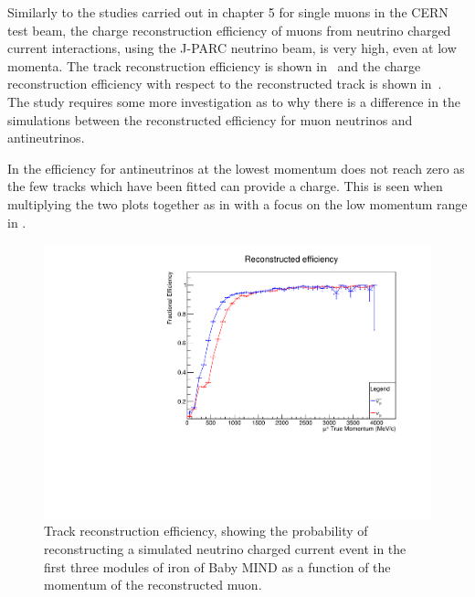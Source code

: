 Similarly to the studies carried out in chapter 5 for single muons in the CERN test beam, the charge reconstruction efficiency of muons from neutrino charged current interactions, using the J-PARC neutrino beam, is very high, even at low momenta. The track reconstruction efficiency is shown in~ and the charge reconstruction efficiency with respect to the reconstructed track is shown in~. The study requires some more investigation as to why there is a difference in the simulations between the reconstructed efficiency for muon neutrinos and antineutrinos.


In  the efficiency for antineutrinos at the lowest momentum does not reach zero as the few tracks which have been fitted can provide a charge. This is seen when multiplying the two plots together as in  with a focus on the low momentum range in .




\begin{figure}[h!]
\centering
\includegraphics[width=.9\textwidth]{figures/NeutrinoChap/Neutrino/T2KIronRecEff.pdf}
\caption{Track reconstruction efficiency, showing the probability of reconstructing a simulated neutrino charged current event in the first three modules of iron of Baby MIND as a function of the momentum of the reconstructed muon.}
\label{fig:IronMINDfitted}
\end{figure}

